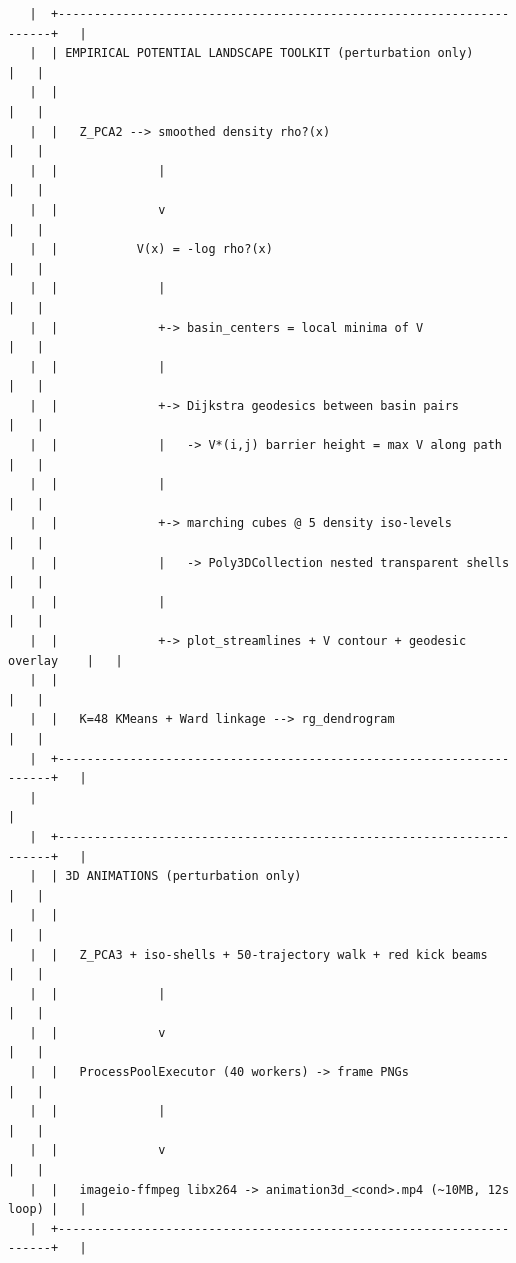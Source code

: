 \documentclass{article}
\theoremstyle{plain}
\theoremstyle{definition}
\begin{document}
\begin{verbatim}
   |  +---------------------------------------------------------------------+   |
   |  | EMPIRICAL POTENTIAL LANDSCAPE TOOLKIT (perturbation only)           |   |
   |  |                                                                     |   |
   |  |   Z_PCA2 --> smoothed density rho?(x)                                  |   |
   |  |              |                                                      |   |
   |  |              v                                                      |   |
   |  |           V(x) = -log rho?(x)                                          |   |
   |  |              |                                                      |   |
   |  |              +-> basin_centers = local minima of V                  |   |
   |  |              |                                                      |   |
   |  |              +-> Dijkstra geodesics between basin pairs             |   |
   |  |              |   -> V*(i,j) barrier height = max V along path        |   |
   |  |              |                                                      |   |
   |  |              +-> marching cubes @ 5 density iso-levels              |   |
   |  |              |   -> Poly3DCollection nested transparent shells       |   |
   |  |              |                                                      |   |
   |  |              +-> plot_streamlines + V contour + geodesic overlay    |   |
   |  |                                                                     |   |
   |  |   K=48 KMeans + Ward linkage --> rg_dendrogram                      |   |
   |  +---------------------------------------------------------------------+   |
   |                                                                            |
   |  +---------------------------------------------------------------------+   |
   |  | 3D ANIMATIONS (perturbation only)                                   |   |
   |  |                                                                     |   |
   |  |   Z_PCA3 + iso-shells + 50-trajectory walk + red kick beams         |   |
   |  |              |                                                      |   |
   |  |              v                                                      |   |
   |  |   ProcessPoolExecutor (40 workers) -> frame PNGs                     |   |
   |  |              |                                                      |   |
   |  |              v                                                      |   |
   |  |   imageio-ffmpeg libx264 -> animation3d_<cond>.mp4 (~10MB, 12s loop) |   |
   |  +---------------------------------------------------------------------+   |

\end{verbatim}
\end{document}
